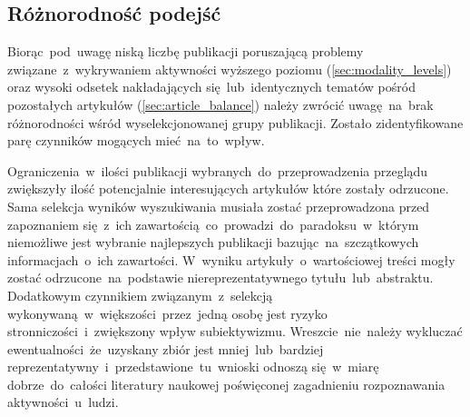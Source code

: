 \subsection{Różnorodność podejść}
Biorąc~pod~uwagę niską liczbę publikacji poruszającą problemy związane~z~wykrywaniem aktywności wyższego poziomu (\ref{sec:modality_levels}) oraz wysoki odsetek nakładających się~lub~identycznych tematów pośród pozostałych artykułów (\ref{sec:article_balance}) należy zwrócić uwagę~na~brak różnorodności wśród wyselekcjonowanej grupy publikacji. Zostało zidentyfikowane parę czynników mogących mieć~na~to~wpływ. 

Ograniczenia~w~ilości publikacji wybranych~do~przeprowadzenia przeglądu zwiększyły ilość potencjalnie interesujących artykułów które zostały odrzucone. Sama selekcja wyników wyszukiwania musiała zostać przeprowadzona przed zapoznaniem się~z~ich zawartością~co~prowadzi~do~paradoksu~w~którym niemożliwe jest wybranie najlepszych publikacji bazując~na~szczątkowych informacjach~o~ich zawartości. W~wyniku artykuły~o~wartościowej treści mogły zostać odrzucone~na~podstawie niereprezentatywnego tytułu~lub~abstraktu. Dodatkowym czynnikiem związanym~z~selekcją wykonywaną~w~większości~przez~jedną osobę jest ryzyko stronniczości~i~zwiększony wpływ subiektywizmu. Wreszcie~nie~należy wykluczać ewentualności~że~uzyskany zbiór jest mniej~lub~bardziej reprezentatywny~i~przedstawione~tu~wnioski odnoszą się~w~miarę dobrze~do~całości literatury naukowej poświęconej zagadnieniu rozpoznawania aktywności~u~ludzi.
